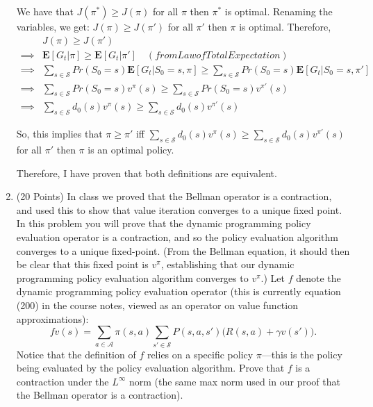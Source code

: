 \documentclass[]{article}
\begin{document}
\begin{enumerate}
{We have that $J(\pi^*) \geq J(\pi)$ for all $\pi$ then $\pi^*$ is optimal. Renaming the variables, we get: $J(\pi) \geq J(\pi')$ for all $\pi'$ then $\pi$ is optimal. Therefore, \\

				\begin{align}
				&J(\pi) \geq J(\pi')  \\
				\implies &\mathbf{E}[G_t | \pi] \geq \mathbf{E}[G_t | \pi'] \quad (from Law of Total Expectation) \\
				\implies &\sum_{s \in \mathcal S} Pr(S_0 = s) \mathbf{E}[G_t | S_0 = s, \pi] \geq \sum_{s \in \mathcal S} Pr(S_0 = s) \mathbf{E}[G_t | S_0 = s, \pi'] \\
				\implies &\sum_{s \in \mathcal S} Pr(S_0 = s) v^\pi(s) \geq \sum_{s \in \mathcal S} Pr(S_0 = s) v^{\pi'}(s) \\
        				\implies &\sum_{s \in \mathcal S} d_0(s) v^\pi(s) \geq \sum_{s \in \mathcal S} d_0(s) v^{\pi'}(s) 
				\end{align}

			So, this implies that $\pi \geq \pi'$ iff $\sum_{s \in \mathcal S}d_0(s)v^\pi(s) \geq \sum_{s \in \mathcal S}d_0(s)v^{\pi'}(s)$ for all $\pi'$ then $\pi$ is an optimal policy.

		Therefore, I have proven that both definitions are equivalent.

	}
 
    \item (20 Points) In class we proved that the Bellman operator is a contraction, and used this to show that value iteration converges to a unique fixed point. In this problem you will prove that the dynamic programming policy evaluation operator is a contraction, and so the policy evaluation algorithm converges to a unique fixed-point. (From the Bellman equation, it should then be clear that this fixed point is $v^\pi$, establishing that our dynamic programming policy evaluation algorithm converges to $v^\pi$.) Let $f$ denote the dynamic programming policy evaluation operator (this is currently equation (200) in the course notes, viewed as an operator on value function approximations):
    \begin{equation}
        fv(s) = \sum_{a \in \mathcal A} \pi(s,a) \sum_{s' \in \mathcal S} P(s,a,s')\big (R(s,a) + \gamma v(s')\big ).
    \end{equation}
    Notice that the definition of $f$ relies on a specific policy $\pi$---this is the policy being evaluated by the policy evaluation algorithm. 
    Prove that $f$ is a contraction under the $L^\infty$ norm (the same max norm used in our proof that the Bellman operator is a contraction).


\end{enumerate}
\end{document}
